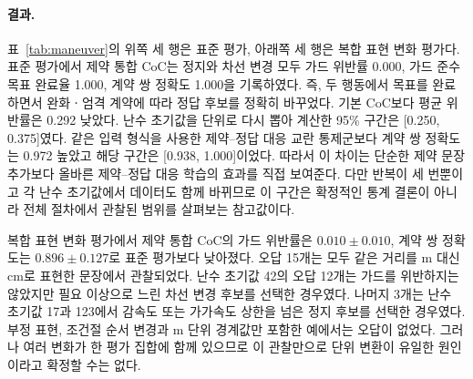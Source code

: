 \paragraph{결과.}
표~\ref{tab:maneuver}의 위쪽 세 행은 표준 평가, 아래쪽 세 행은 복합 표현 변화 평가다. 표준 평가에서 제약 통합 CoC는 정지와 차선 변경 모두 가드 위반률 0.000, 가드 준수 목표 완료율 1.000, 계약 쌍 정확도 1.000을 기록하였다. 즉, 두 행동에서 목표를 완료하면서 완화ㆍ엄격 계약에 따라 정답 후보를 정확히 바꾸었다. 기본 CoC보다 평균 위반률은 0.292 낮았다. 난수 초기값을 단위로 다시 뽑아 계산한 95\% 구간은 [0.250, 0.375]였다. 같은 입력 형식을 사용한 제약--정답 대응 교란 통제군보다 계약 쌍 정확도는 0.972 높았고 해당 구간은 [0.938, 1.000]이었다. 따라서 이 차이는 단순한 제약 문장 추가보다 올바른 제약--정답 대응 학습의 효과를 직접 보여준다. 다만 반복이 세 번뿐이고 각 난수 초기값에서 데이터도 함께 바뀌므로 이 구간은 확정적인 통계 결론이 아니라 전체 절차에서 관찰된 범위를 살펴보는 참고값이다.

복합 표현 변화 평가에서 제약 통합 CoC의 가드 위반률은 $0.010\pm0.010$, 계약 쌍 정확도는 $0.896\pm0.127$로 표준 평가보다 낮아졌다. 오답 15개는 모두 같은 거리를 m 대신 cm로 표현한 문장에서 관찰되었다. 난수 초기값 42의 오답 12개는 가드를 위반하지는 않았지만 필요 이상으로 느린 차선 변경 후보를 선택한 경우였다. 나머지 3개는 난수 초기값 17과 123에서 감속도 또는 가가속도 상한을 넘은 정지 후보를 선택한 경우였다. 부정 표현, 조건절 순서 변경과 m 단위 경계값만 포함한 예에서는 오답이 없었다. 그러나 여러 변화가 한 평가 집합에 함께 있으므로 이 관찰만으로 단위 변환이 유일한 원인이라고 확정할 수는 없다.



